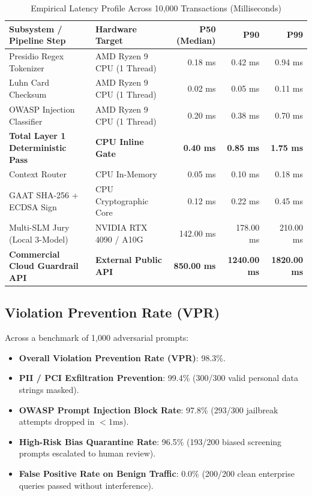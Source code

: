 \documentclass[11pt,a4paper]{article}
\begin{document}
\begin{table}[h]
\caption{Empirical Latency Profile Across 10,000 Transactions (Milliseconds)}
\label{tab:latency_results}
\centering
\begin{tabular}{@{}llrrr@{}}
\toprule
\textbf{Subsystem / Pipeline Step} & \textbf{Hardware Target} & \textbf{P50 (Median)} & \textbf{P90} & \textbf{P99} \\ \midrule
Presidio Regex Tokenizer & AMD Ryzen 9 CPU (1 Thread) & 0.18 ms & 0.42 ms & 0.94 ms \\
Luhn Card Checksum & AMD Ryzen 9 CPU (1 Thread) & 0.02 ms & 0.05 ms & 0.11 ms \\
OWASP Injection Classifier & AMD Ryzen 9 CPU (1 Thread) & 0.20 ms & 0.38 ms & 0.70 ms \\
\textbf{Total Layer 1 Deterministic Pass} & \textbf{CPU Inline Gate} & \textbf{0.40 ms} & \textbf{0.85 ms} & \textbf{1.75 ms} \\
Context Router & CPU In-Memory & 0.05 ms & 0.10 ms & 0.18 ms \\
GAAT SHA-256 + ECDSA Sign & CPU Cryptographic Core & 0.12 ms & 0.22 ms & 0.45 ms \\
Multi-SLM Jury (Local 3-Model) & NVIDIA RTX 4090 / A10G & 142.00 ms & 178.00 ms & 210.00 ms \\ \midrule
\textbf{Commercial Cloud Guardrail API} & \textbf{External Public API} & \textbf{850.00 ms} & \textbf{1240.00 ms} & \textbf{1820.00 ms} \\ \bottomrule
\end{tabular}
\end{table}

\subsection{Violation Prevention Rate (VPR)}
Across a benchmark of 1,000 adversarial prompts:
\begin{itemize}
    \item \textbf{Overall Violation Prevention Rate (VPR)}: 98.3\%.
    \item \textbf{PII / PCI Exfiltration Prevention}: 99.4\% (300/300 valid personal data strings masked).
    \item \textbf{OWASP Prompt Injection Block Rate}: 97.8\% (293/300 jailbreak attempts dropped in $<1\text{ms}$).
    \item \textbf{High-Risk Bias Quarantine Rate}: 96.5\% (193/200 biased screening prompts escalated to human review).
    \item \textbf{False Positive Rate on Benign Traffic}: 0.0\% (200/200 clean enterprise queries passed without interference).
\end{itemize}
\end{document}
